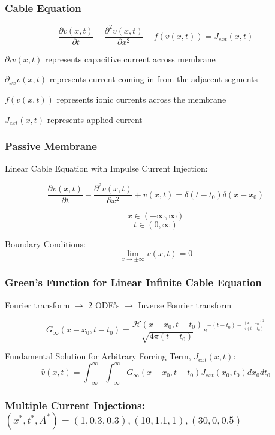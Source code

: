 \documentclass{beamer}
\begin{document}
\begin{frame}
\frametitle{Cable Equation}
\[\frac{\partial{v(x,t)}}{\partial{t}} - \frac{\partial^2{v(x,t)}}{\partial{x}^2} - f(v(x,t))= J_{ext}(x,t)\] \newline

$ \partial_t{v(x,t)} $ represents capacitive current across membrane \newline 

$ \partial_{xx}{v(x,t)} $ represents current coming in from the adjacent segments \newline 

$  f(v(x,t))$ represents ionic currents across the membrane \newline 

$ J_{ext}(x,t)$ represents applied current
\end{frame}


\begin{frame}
\frametitle{Passive Membrane}
Linear Cable Equation with Impulse Current Injection:

$$\frac{\partial{v(x,t)}}{\partial{t}} - \frac{\partial^2{v(x,t)}}{\partial{x}^2} + v(x,t)=\delta(t-t_0)\delta(x-x_0)$$ 

$$x \in (-\infty, \infty)$$
$$t \in (0,\infty)$$ \newline

Boundary Conditions:
$$\lim_{x\to \pm \infty} v(x,t) = 0$$
\end{frame}

\begin{frame}
\frametitle{Green's Function for Linear Infinite Cable Equation}
Fourier transform $\rightarrow$ 2 ODE's $\rightarrow$ Inverse Fourier transform

$$  G_{\infty}(x-x_0,t-t_0) = \frac{\mathcal{H}(x-x_0,t-t_0)}{\sqrt{4\pi (t-t_0)}}e^{-(t-t_0)-\frac{(x-x_0)^2}{4(t-t_0)}}$$\newline

Fundamental Solution for Arbitrary Forcing Term, $J_{ext}(x,t)$:
$$ \hat{v}(x,t) = \int_{-\infty}^{\infty}\int_{-\infty}^{\infty}G_{\infty}(x-x_0,t-t_0)J_{ext}(x_0,t_0)dx_0dt_0 $$
\end{frame}

\begin{frame}
\frametitle{Multiple Current Injections: $(x^*,t^*,A^*) = (1, 0.3, 0.3), (10,1.1,1), (30,0,0.5)$}
	
\end{frame}
\end{document}
